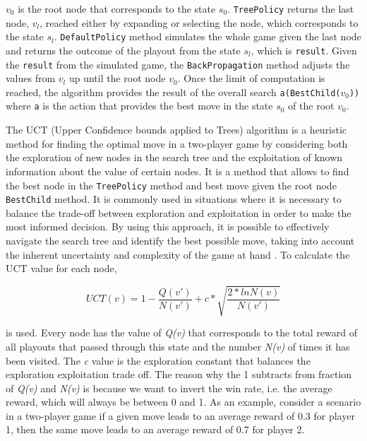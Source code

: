 $v_0$ is the root node that corresponds to the state $s_0$. \texttt{TreePolicy} returns the last node, $v_l$, reached either by expanding or selecting the node, which corresponds to the state $s_l$. \texttt{DefaultPolicy} method simulates the whole game given the last node and returns the outcome of the playout from the state $s_l$, which is \texttt{result}. Given the \texttt{result} from the simulated game, the \texttt{BackPropagation} method adjusts the values from $v_l$ up until the root node $v_0$. Once the limit of computation is reached, the algorithm provides the result of the overall search \texttt{a(BestChild($v_0$))} where \texttt{a} is the action that provides the best move in the state $s_0$ of the root $v_0$.

The UCT (Upper Confidence bounds applied to Trees) algorithm is a heuristic method for finding the optimal move in a two-player game by considering both the exploration of new nodes in the search tree and the exploitation of known information about the value of certain nodes. It is a method that allows to find the best node in the \texttt{TreePolicy} method and best move given the root node \texttt{BestChild} method. It is commonly used in situations where it is necessary to balance the trade-off between exploration and exploitation in order to make the most informed decision. By using this approach, it is possible to effectively navigate the search tree and identify the best possible move, taking into account the inherent uncertainty and complexity of the game at hand \citep{MCTSSurvey}. To calculate the UCT value for each node, 

\[ UCT(v) = 1 - \frac{Q(v')}{N(v')} + c*\sqrt{\frac{2 * ln{N(v)}}{N(v')}} \]

is used. Every node has the value of \textit{Q(v)} that corresponds to the total reward of all playouts that passed through this state and the number \textit{N(v)} of times it has been visited. The \textit{c} value is the exploration constant that balances the exploration exploitation trade off. The reason why the 1 subtracts from fraction of \textit{Q(v)} and \textit{N(v)} is because we want to invert the win rate, i.e. the average reward, which will always be between 0 and 1. As an example, consider a scenario in a two-player game if a given move leads to an average reward of 0.3 for player 1, then the same move leads to an average reward of 0.7 for player 2. 

